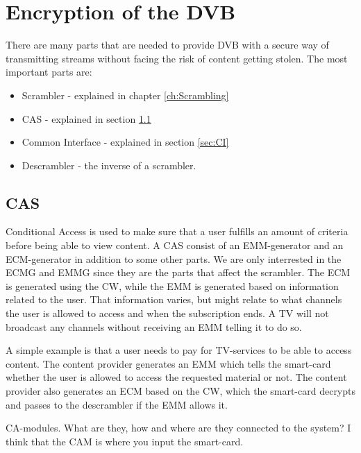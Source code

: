 \chapter{Encryption of the DVB}
There are many parts that are needed to provide DVB with a secure way of 
transmitting streams without facing the risk of content getting stolen. The 
most important parts are:

\begin{itemize}
\item Scrambler - explained in chapter \ref{ch:Scrambling}
\item CAS - explained in section \ref{sec:CAS}
\item Common Interface - explained in section \ref{sec:CI}
\item Descrambler - the inverse of a scrambler.
\end{itemize}

\section{CAS} \label{sec:CAS}
Conditional Access is used to make sure that a user fulfills an amount of 
criteria before being able to view content. A CAS consist of an EMM-generator 
and an ECM-generator in addition to some other parts. We are only interrested 
in the ECMG and EMMG since they are the parts that affect the scrambler. The 
ECM is generated using the CW, while the EMM is generated based on information 
related to the user. That information varies, but might relate to what channels 
the user is allowed to access and when the subscription ends. A TV will not 
broadcast any channels without receiving an EMM telling it to do so.


A simple example is that a user needs to pay for TV-services to be able to access
content. The content provider generates an EMM which tells the smart-card whether
the user is allowed to access the requested material or not. The content provider
also generates an ECM based on the CW, which the smart-card decrypts and passes 
to the descrambler if the EMM allows it.

CA-modules. What are they, how and where are they connected to the system? I 
think that the CAM is where you input the smart-card. 

